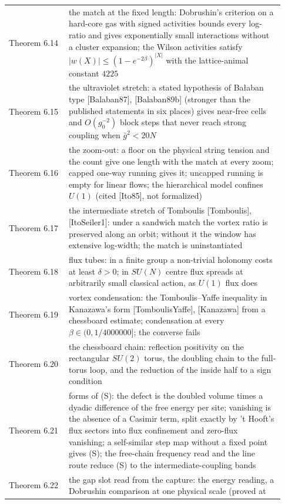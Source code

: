 \documentclass[10pt,letterpaper,twocolumn]{article}
\begin{document}
\begin{center}
{\begin{xtabular}{L{0.207\linewidth}L{0.724\linewidth}}
Theorem 6.14 & the match at the fixed length: Dobrushin's criterion on a hard-core gas
with signed activities bounds every log-ratio and gives exponentially
small interactions without a cluster expansion; the Wilson activities
satisfy \(\lvert w(X)\rvert\le(1-e^{-2\beta})^{\lvert X\rvert}\) with
the lattice-animal constant \(4225\) \\
Theorem 6.15 & the ultraviolet stretch: a stated hypothesis of Bałaban type
{[}Balaban87{]}, {[}Balaban89b{]} (stronger than the published
statements in six places) gives near-free cells and \(O(g_0^{-2})\)
block steps that never reach strong coupling when \(\bar g^2<20N\) \\
Theorem 6.16 & the zoom-out: a floor on the physical string tension and the count give
one length with the match at every zoom; capped one-way running gives
it; uncapped running is empty for linear flows; the hierarchical model
confines \(U(1)\) (cited {[}Ito85{]}, not formalized) \\
Theorem 6.17 & the intermediate stretch of Tomboulis {[}Tomboulis{]}, {[}ItoSeiler1{]}:
under a sandwich match the vortex ratio is preserved along an orbit;
without it the window has extensive log-width; the match is
uninstantiated \\
Theorem 6.18 & flux tubes: in a finite group a non-trivial holonomy costs at least
\(\delta>0\); in \(SU(N)\) centre flux spreads at arbitrarily small
classical action, as \(U(1)\) flux does \\
Theorem 6.19 & vortex condensation: the Tomboulis--Yaffe inequality in Kanazawa's form
{[}TomboulisYaffe{]}, {[}Kanazawa{]} from a chessboard estimate;
condensation at every \(\beta\in(0,1/4000000]\); the converse fails \\
Theorem 6.20 & the chessboard chain: reflection positivity on the rectangular \(SU(2)\)
torus, the doubling chain to the full-torus loop, and the reduction of
the inside half to a sign condition \\
Theorem 6.21 & forms of (S): the defect is the doubled volume times a dyadic difference
of the free energy per site; vanishing is the absence of a Casimir term,
split exactly by 't Hooft's flux sectors into flux confinement and
zero-flux vanishing; a self-similar step map without a fixed point gives
(S); the free-chain frequency read and the line route reduce (S) to the
intermediate-coupling bands \\
Theorem 6.22 & the gap slot read from the capture: the energy reading, a Dobrushin
comparison at one physical scale (proved at

\end{xtabular}}
\end{center}
\end{document}
